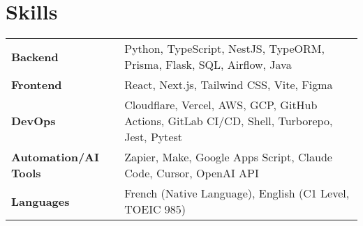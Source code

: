 \documentclass[a4paper,10pt]{article}
\begin{document}
\section{Skills}

\begin{tabularx}{\linewidth}{@{}l X@{}}
    \textbf{Backend}             & \normalsize{Python, TypeScript, NestJS, TypeORM, Prisma, Flask, SQL, Airflow, Java}                     \\
    \textbf{Frontend}            & \normalsize{React, Next.js, Tailwind CSS, Vite, Figma}                                                  \\
    \textbf{DevOps}              & \normalsize{Cloudflare, Vercel, AWS, GCP, GitHub Actions, GitLab CI/CD, Shell, Turborepo, Jest, Pytest} \\
    \textbf{Automation/AI Tools} & \normalsize{Zapier, Make, Google Apps Script, Claude Code, Cursor, OpenAI API}                          \\
    \textbf{Languages}           & \normalsize{French (Native Language), English (C1 Level, TOEIC 985)}                                    \\
\end{tabularx}
\end{document}
